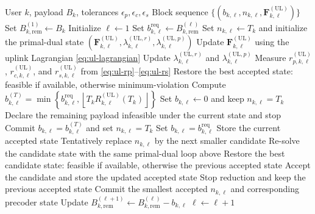 \documentclass[11pt]{article}
\newcommand{\F}{\mathbf{F}}
\newcommand{\norm}[1]{\left\lVert #1 \right\rVert}
\newcommand{\floor}[1]{\left\lfloor #1 \right\rfloor}
\newcommand{\UL}{\mathrm{UL}}
\begin{document}
\begin{algorithm}[H]
\caption{Training-Only Uplink User Solver}
\label{alg:ul-train-only}
\small
\begin{algorithmic}[1]
\Require User $k$, payload $B_k$, tolerances $\epsilon_p,\epsilon_c,\epsilon_s$
\Ensure Block sequence $\{(b_{k,\ell},n_{k,\ell},\F_{k,\ell}^{(\UL)})\}$
\State Set $B_{k,\mathrm{rem}}^{(1)} \gets B_k$
\State Initialize $\ell \gets 1$
    \State Set $b_{k,\ell}^{\mathrm{req}} \gets B_{k,\mathrm{rem}}^{(\ell)}$
    \State Set $n_{k,\ell}\gets T_k$ and initialize the primal-dual state $(\F_{k,\ell}^{(\UL)},\lambda_{k,\ell}^{(\UL,r)},\lambda_{k,\ell}^{(\UL,p)})$
    \Repeat
        \State Update $\F_{k,\ell}^{(\UL)}$ using the uplink Lagrangian \eqref{eq:ul-lagrangian}
        \State Update $\lambda_{k,\ell}^{(\UL,r)}$ and $\lambda_{k,\ell}^{(\UL,p)}$
        \State Measure $r_{p,k,\ell}^{(\UL)}$, $r_{c,k,\ell}^{(\UL)}$, and $r_{s,k,\ell}^{(\UL)}$ from \eqref{eq:ul-rp}--\eqref{eq:ul-rs}
    \State Restore the best accepted state: feasible if available, otherwise minimum-violation
    \State Compute $b_{k,\ell}^{(T)}=\min\!\left\{b_{k,\ell}^{\mathrm{req}},\floor{T_k R_{k,\ell}^{(\UL)}(T_k)}\right\}$
        \State Set $b_{k,\ell}\gets 0$ and keep $n_{k,\ell}=T_k$
        \State Declare the remaining payload infeasible under the current state and stop
        \State Commit $b_{k,\ell}=b_{k,\ell}^{(T)}$ and set $n_{k,\ell}=T_k$
    \Else
        \State Set $b_{k,\ell}=b_{k,\ell}^{\mathrm{req}}$
        \State Store the current accepted state
            \State Tentatively replace $n_{k,\ell}$ by the next smaller candidate
            \State Re-solve the candidate state with the same primal-dual loop above
            \State Restore the best candidate state: feasible if available, otherwise the previous accepted state
            \If{$\dfrac{b_{k,\ell}}{n_{k,\ell}} \le R_{k,\ell}^{(\UL)}$ and $\norm{\F_{k,\ell}^{(\UL)}}_F^2 \le P_k$}
                \State Accept the candidate and store the updated accepted state
            \Else
                \State Stop reduction and keep the previous accepted state
            \EndIf
        \EndWhile
        \State Commit the smallest accepted $n_{k,\ell}$ and corresponding precoder state
    \EndIf
    \State Update $B_{k,\mathrm{rem}}^{(\ell+1)} \gets B_{k,\mathrm{rem}}^{(\ell)} - b_{k,\ell}$
    \State $\ell \gets \ell + 1$
\EndWhile
\end{algorithmic}
\end{algorithm}
\end{document}
